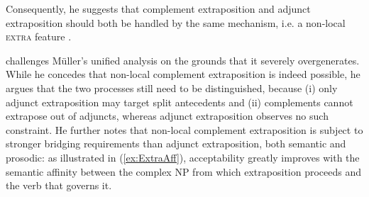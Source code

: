 \documentclass[output=paper
                ,modfonts
                ,nonflat
	        ,collection
	        ,collectionchapter
	        ,collectiontoclongg
 	        ,biblatex
                ,babelshorthands
                ,newtxmath
                ,draftmode
                ,colorlinks, citecolor=brown
]{./langsci/langscibook}
\begin{document}
{\begin{exe}
\begin{xlist}
    
  \end{xlist}
\end{exe}

Consequently, he suggests that complement extraposition and adjunct
extraposition should both be handled by the same mechanism, i.e. a non-local
\textsc{extra} feature \citep{Keller:95,Mueller99a}. 

\citet{crysmann_b09xtra} challenges Müller's unified analysis on the
grounds that it severely overgenerates.  While he concedes that
non-local complement extraposition is indeed possible, he argues that
the two processes still need to be distinguished, because (i) only
adjunct extraposition may target split antecedents and (ii)
complements cannot extrapose out of adjuncts, whereas adjunct
extraposition observes no such constraint.  He further notes that
non-local complement extraposition is subject to stronger bridging
requirements than adjunct extraposition, both semantic and prosodic:
as illustrated in (\ref{ex:ExtraAff}), acceptability greatly improves
with the semantic affinity between the complex NP from which
extraposition proceeds and the verb that governs it.

\begin{exe}
  \ex \label{ex:ExtraAff}
  \begin{xlist}
    
  \end{xlist}
\end{exe}

}
\end{document}
